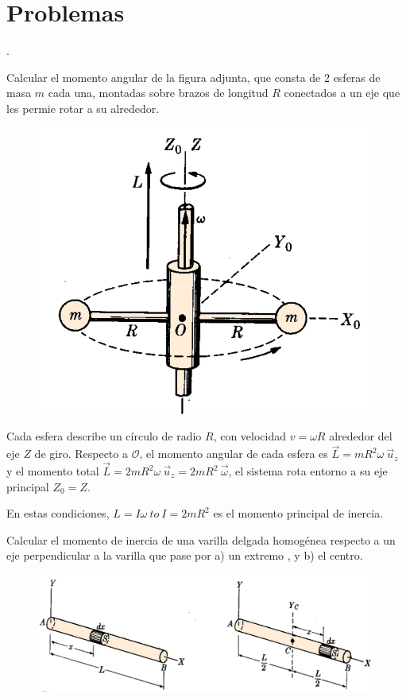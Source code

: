 \section{Problemas}
\begin{prob}

\begin{multicols}{2}.

Calcular el momento angular de la figura adjunta, que consta de 2 esferas de masa $m$ cada una, montadas sobre brazos de longitud $R$ conectados a un eje que les permie rotar a su alrededor. 	
\begin{figure}[H]
	\centering
	\includegraphics[width=.4\textwidth]{imagenes/imagenes16/T16IM08.png}
\end{figure}
\end{multicols}	
\end{prob}

Cada esfera describe un círculo de radio $R$, con velocidad $v=\omega R$ alrededor del eje $Z$ de giro. Respecto a $\mathcal O$, el momento angular de cada esfera es $\vec L=mR^2\omega \ \vec u_z$ y el momento total $\vec L=2mR^2\omega \ \vec u_z=2mR^2 \ \vec \omega$, el sistema rota entorno a su eje principal $Z_0=Z$.

En estas condiciones, $L=I\omega \ to \ I=2mR^2$ es el momento principal de inercia.


\begin{prob}
Calcular el momento de inercia de una varilla delgada homogénea respecto a un eje perpendicular a la varilla que pase por  a)  un extremo	, y b) el centro.
\end{prob}
\begin{figure}[H]
	\centering
	\includegraphics[width=.9\textwidth]{imagenes/imagenes16/T16IM09.png}
\end{figure}

